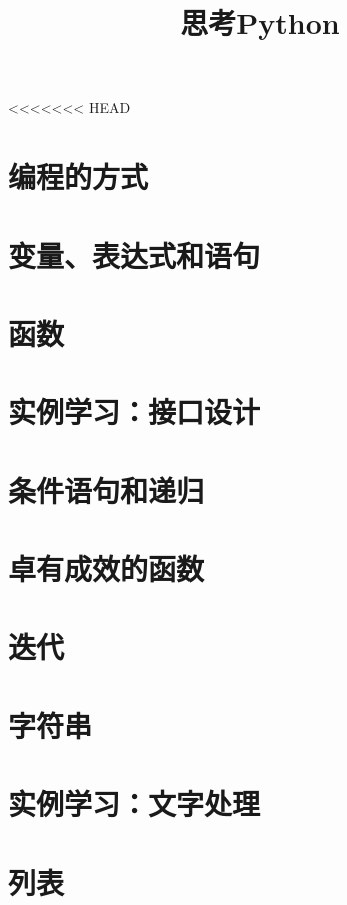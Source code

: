 \documentclass[10pt]{book}
\title{思考Python}
\begin{document}
\frontmatter



\mainmatter

<<<<<<< HEAD
\chapter{编程的方式}


\chapter{变量、表达式和语句}


\chapter{函数}


\chapter{实例学习：接口设计}


\chapter{条件语句和递归}


\chapter{卓有成效的函数}


\chapter{迭代}


\chapter{字符串}


\chapter{实例学习：文字处理}


\chapter{列表}

\end{document}
